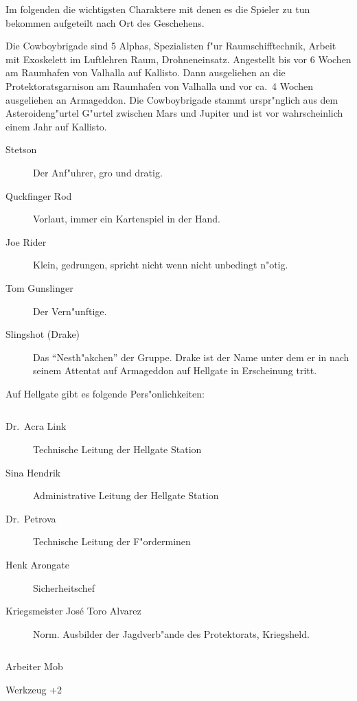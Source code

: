 
Im folgenden die wichtigsten Charaktere mit denen es die Spieler zu tun bekommen aufgeteilt nach Ort des Geschehens.


Die Cowboybrigade sind 5 Alphas, Spezialisten f"ur Raumschifftechnik, Arbeit mit Exoskelett im Luftlehren Raum, Drohneneinsatz.
Angestellt bis vor 6 Wochen am Raumhafen von Valhalla auf Kallisto. Dann ausgeliehen an die Protektoratsgarnison am Raumhafen von Valhalla und vor ca.~4 Wochen ausgeliehen an Armageddon. Die Cowboybrigade stammt urspr"nglich aus dem Asteroideng"urtel G"urtel zwischen Mars und Jupiter und ist vor wahrscheinlich einem Jahr auf Kallisto.

\begin{description}
    \item[Stetson] Der Anf"uhrer, gro\3 und dratig.
    \item[Quckfinger Rod] Vorlaut, immer ein Kartenspiel in der Hand.
    \item[Joe Rider] Klein, gedrungen, spricht nicht wenn nicht unbedingt n"otig.
    \item[Tom Gunslinger] Der Vern"unftige.
    \item[Slingshot (Drake)] Das "`Nesth"akchen"' der Gruppe. Drake ist der Name unter dem er in nach seinem Attentat 
        auf Armageddon auf Hellgate in Erscheinung tritt.
\end{description}

\newpage


Auf Hellgate gibt es folgende Pers"onlichkeiten: 

\begin{column}[l]{0.45}
    \begin{description}
        \item[Dr.~Acra Link] Technische Leitung der Hellgate Station
        \item[Sina Hendrik] Administrative Leitung der Hellgate Station
        \item[Dr.~Petrova] Technische Leitung der F"orderminen
        \item[Henk Arongate] Sicherheitschef    
        \item[Kriegsmeister Jos\'{e} \frqq{}Toro\flqq{} Alvarez] Norm. Ausbilder der Jagdverb"ande des Protektorats, Kriegsheld.
    \end{description}
\end{column}
\begin{column}[r]{0.45}
    \begin{nscsheet}[h]{Arbeiter Mob}
        \nscstats[ATT=2,AGG=1,EMP=1,KNO=1,HP=10]
        \nscruler
        \begin{nscinventory}
            \nscitem[Waffen] Werkzeug +2            
        \end{nscinventory}
    \end{nscsheet}
\end{column}


